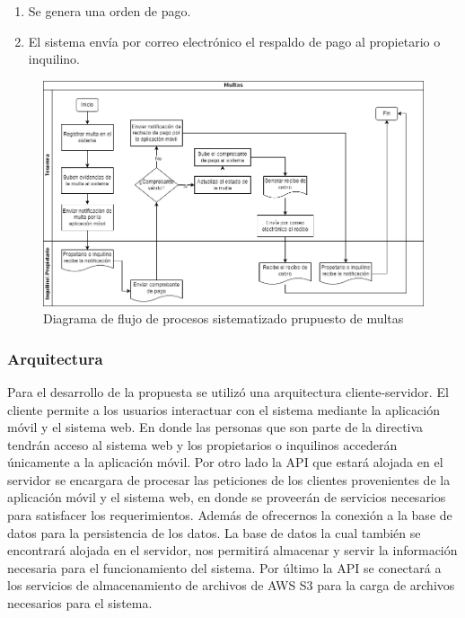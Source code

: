 \begin{itemize}
\begin{enumerate}
\begin{enumerate}
            \item Se genera una orden de pago.
            \item El sistema envía por correo electrónico el respaldo de pago al propietario o inquilino.
        \end{enumerate}
        \begin{figure}[H]
            \centering
            \includegraphics[width=1\textwidth]{resources/images/Diagrama de flujo de proceso multas propuesta}
            \caption{Diagrama de flujo de procesos sistematizado prupuesto de multas}
            \label{fig:flujo-proceso-prupuesto-multas}
        \end{figure}
    \end{enumerate}
\end{itemize}


\subsubsection{Arquitectura}

Para el desarrollo de la propuesta se utilizó una arquitectura cliente-servidor.
El cliente permite a los usuarios interactuar con el sistema mediante la aplicación móvil y el sistema web.
En donde las personas que son parte de la directiva tendrán acceso al sistema web y los propietarios o inquilinos accederán únicamente a la aplicación móvil.
Por otro lado la API que estará alojada en el servidor se encargara de procesar las peticiones de los clientes provenientes de la aplicación móvil y el sistema web, en  donde se proveerán de servicios necesarios para satisfacer los requerimientos.
Además de ofrecernos la conexión a la base de datos para la persistencia de los datos.
La base de datos la cual también se encontrará alojada en el servidor, nos permitirá almacenar y servir la información necesaria para el funcionamiento del sistema.
Por último la API se conectará a los servicios de almacenamiento de archivos de AWS S3 para la carga de archivos necesarios para el sistema.

